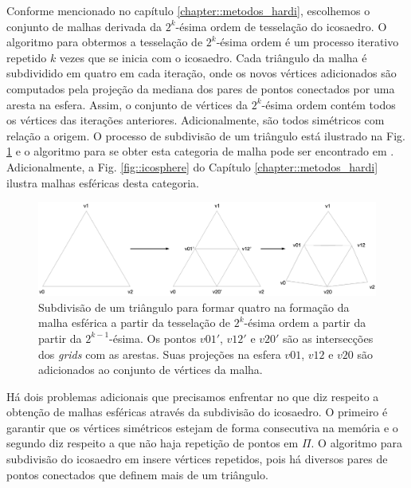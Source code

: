 \documentclass[
    12pt,                %
    oneside,            %
    a4paper,            %
    english,            %
    french,                %
    spanish,            %
    brazil                %
    ]{abntex2}
\begin{document}
Conforme mencionado no capítulo \ref{chapter::metodos_hardi}, escolhemos o conjunto de malhas derivada da $2^k$-ésima ordem de tesselação do icosaedro. O algoritmo para obtermos a tesselação de $2^k$-ésima ordem é um processo iterativo repetido $k$ vezes que se inicia com o icosaedro. Cada triângulo da malha é subdividido em quatro em cada iteração, onde os novos vértices adicionados são computados pela projeção da mediana dos pares de pontos conectados por uma aresta na esfera. Assim, o conjunto de vértices da $2^k$-ésima ordem contém todos os vértices das iterações anteriores. Adicionalmente, são todos simétricos com relação a origem. O processo de subdivisão de um triângulo está ilustrado na Fig. \ref{fig::triangle_icosahedron} e o algoritmo para se obter esta categoria de malha pode ser encontrado em . Adicionalmente, a Fig. \ref{fig::icosphere} do Capítulo \ref{chapter::metodos_hardi} ilustra malhas esféricas desta categoria.

\begin{figure}[htb]
    \centering
    \includegraphics[width=1.0\linewidth, angle=0]{figs/Esquema_Glifo/ico_subdivision.png}
    \caption{
    Subdivisão de um triângulo para formar quatro na formação da malha esférica a partir da tesselação de $2^k$-ésima ordem a partir da partir da $2^{k-1}$-ésima. Os pontos $v01'$, $v12'$ e $v20'$ são as intersecções dos \textit{grids} com as arestas. Suas projeções na esfera $v01$, $v12$ e $v20$ são adicionados ao conjunto de vértices da malha.
    }
    \label{fig::triangle_icosahedron}
\end{figure}

Há dois problemas adicionais que precisamos enfrentar no que diz respeito a obtenção de malhas esféricas através da subdivisão do icosaedro. O primeiro é garantir que os vértices simétricos estejam de forma consecutiva na memória e o segundo diz respeito a que não haja repetição de pontos em $\Pi$. O algoritmo para subdivisão do icosaedro em  insere vértices repetidos, pois há diversos pares de pontos conectados que definem mais de um triângulo.
\end{document}
